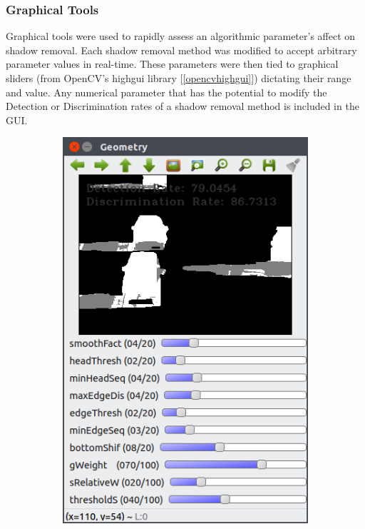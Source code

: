 \documentclass[12pt]{report}
\begin{document}
\subsubsection{Graphical Tools}
Graphical tools were used to rapidly assess an algorithmic parameter's affect on shadow removal. Each shadow removal method was modified to accept arbitrary parameter values in real-time. These parameters were then tied to graphical sliders (from OpenCV's highgui library [\ref{opencvhighgui}]) dictating their range and value. Any numerical parameter that has the potential to modify the Detection or Discrimination rates of a shadow removal method is included in the GUI. 

\begin{figure}
\centering
\begin{subfigure}{.49\linewidth}
  \centering
  \includegraphics[width=.7\linewidth]{figures/geo_highway1_default.png}
  \label{fig:sub1}
\end{subfigure}
\hfill
\begin{subfigure}{.49\linewidth}
  \centering

\end{subfigure}
\end{figure}
\end{document}
